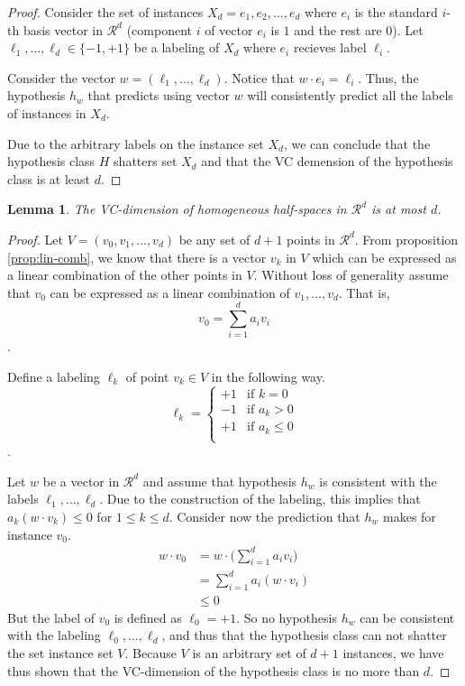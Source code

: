 \documentclass[11pt]{article}
\newtheorem{lemma}{Lemma}[section]
\begin{document}
\begin{proof}
    Consider the set of instances $X_d = {e_1, e_2, \dots, e_d}$ where $e_i$ is the standard $i$-th basis vector in $\mathcal{R}^d$ (component $i$ of vector $e_i$ is $1$ and the rest are $0$).
    Let $\ell_1, \dots, \ell_d \in \{-1,+1\}$ be a labeling of $X_d$ where $e_i$ recieves label $\ell_i$.

    Consider the vector $w = (\ell_1, \dots, \ell_d)$.
    Notice that $w \cdot e_i = \ell_i$.
    Thus, the hypothesis $h_w$ that predicts using vector $w$ will consistently predict all the labels of instances in $X_d$.

    Due to the arbitrary labels on the instance set $X_d$, we can conclude that the hypothesis class $H$ shatters set $X_d$ and that the VC demension of the hypothesis class is at least $d$.
\end{proof}

\begin{lemma}
    The VC-dimension of homogeneous half-spaces in $\mathcal{R}^d$ is at most $d$.
\end{lemma}

\begin{proof}
    Let $V=(v_0, v_1, \dots, v_d)$ be any set of $d+1$ points in $\mathcal{R}^d$.
    From proposition \ref{prop:lin-comb}, we know that there is a vector $v_k$ in $V$ which can be expressed as a linear combination of the other points in $V$.
    Without loss of generality assume that $v_0$ can be expressed as a linear combination of $v_1, \dots, v_d$.
    That is,
    \[
    v_0 = \sum_{i=1}^{d} a_i v_i
    \].

    Define a labeling $\ell_k$ of point $v_k \in V$ in the following way.
    \[
    \ell_k = \begin{cases}
        +1  &  \text{if } k = 0   \\
        -1  &  \text{if } a_k > 0 \\
        +1  &  \text{if } a_k \leq 0 \\
    \end{cases}
    \].

    Let $w$ be a vector in $\mathcal{R}^d$ and assume that hypothesis $h_w$ is consistent with the labels $\ell_1, \dots, \ell_d$.
    Due to the construction of the labeling, this implies that $a_k (w \cdot v_k) \leq 0$ for $1 \leq k \leq d$.
    Consider now the prediction that $h_w$ makes for instance $v_0$.
    \begin{align*}
        w \cdot v_0 &= w \cdot \bigg( \sum_{i=1}^{d} a_i v_i \bigg) \\
            &= \sum_{i=1}^{d} a_i (w \cdot v_i) \\
            &\leq 0
    \end{align*}
    But the label of $v_0$ is defined as $\ell_0 = +1$.
    So no hypothesis $h_w$ can be consistent with the labeling $\ell_0, \dots, \ell_d$, and thus that the hypothesis class can not shatter the set instance set $V$.
    Because $V$ is an arbitrary set of $d+1$ instances, we have thus shown that the VC-dimension of the hypothesis class is no more than $d$.
\end{proof}
\end{document}

